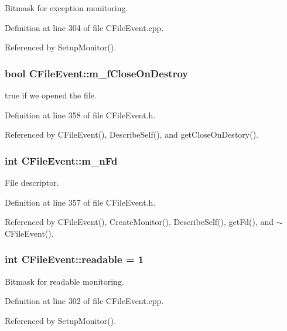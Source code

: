 Bitmask for exception monitoring.



Definition at line 304 of file CFile\-Event.cpp.

Referenced by Setup\-Monitor().
\subsubsection{\setlength{\rightskip}{0pt plus 5cm}bool CFile\-Event::m\_\-f\-Close\-On\-Destroy\hspace{0.3cm}{\tt  [private]}}\label{classCFileEvent_o1}


true if we opened the file.



Definition at line 358 of file CFile\-Event.h.

Referenced by CFile\-Event(), Describe\-Self(), and get\-Close\-On\-Destory().
\subsubsection{\setlength{\rightskip}{0pt plus 5cm}int CFile\-Event::m\_\-n\-Fd\hspace{0.3cm}{\tt  [private]}}\label{classCFileEvent_o0}


File descriptor.



Definition at line 357 of file CFile\-Event.h.

Referenced by CFile\-Event(), Create\-Monitor(), Describe\-Self(), get\-Fd(), and $\sim$CFile\-Event().
\subsubsection{\setlength{\rightskip}{0pt plus 5cm}int CFile\-Event::readable = 1\hspace{0.3cm}{\tt  [static]}}\label{classCFileEvent_p0}


Bitmask for readable monitoring.



Definition at line 302 of file CFile\-Event.cpp.

Referenced by Setup\-Monitor().
